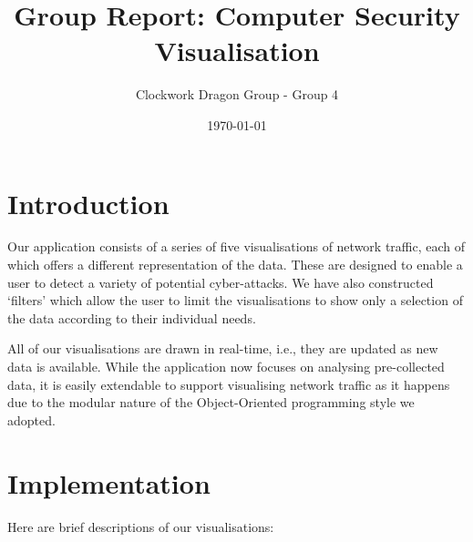 \documentclass[12pt,a4paper]{article}
\author{Clockwork Dragon Group - Group 4}
\title{Group Report: Computer Security Visualisation}
\date{\today}
\begin{document}
	
	\maketitle

    \section*{Introduction}
	Our application consists of a series of five visualisations of network traffic, each of which offers a different representation of the data. These are designed to enable a user to detect a variety of potential cyber-attacks. 
			We have also constructed `filters' which allow the user to limit the visualisations to show only a selection of the data according to their individual needs. 
			
			All of our visualisations are drawn in real-time, i.e., they are updated as new data is available. While the application now focuses on analysing pre-collected data, it is easily extendable to support visualising network traffic as it happens due to the modular nature of the Object-Oriented programming style we adopted.

    \section*{Implementation}
			Here are brief descriptions of our visualisations:
			
\end{document}
